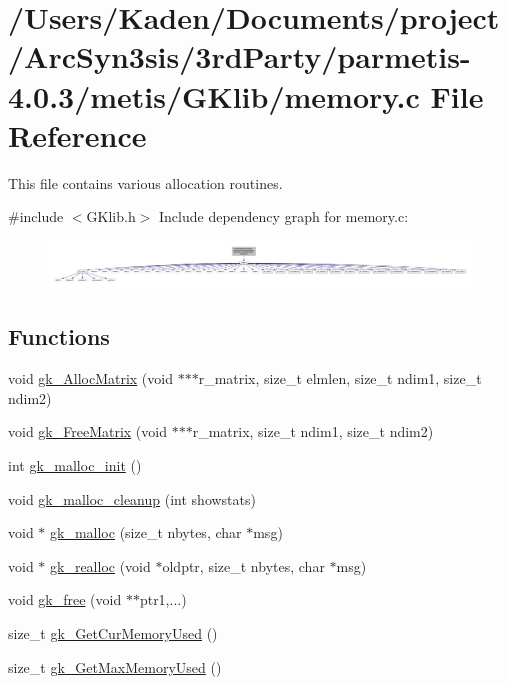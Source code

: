 \hypertarget{a00110}{}\section{/\+Users/\+Kaden/\+Documents/project/\+Arc\+Syn3sis/3rd\+Party/parmetis-\/4.0.3/metis/\+G\+Klib/memory.c File Reference}
\label{a00110}


This file contains various allocation routines.  


{\ttfamily \#include $<$G\+Klib.\+h$>$}\newline
Include dependency graph for memory.\+c\+:\nopagebreak
\begin{figure}[H]
\begin{center}
\leavevmode
\includegraphics[width=350pt]{a00111}
\end{center}
\end{figure}
\subsection*{Functions}
\begin{DoxyCompactItemize}
\item 
void \hyperlink{a00110_af59ba46496f920cc424b8088f4cd7818}{gk\+\_\+\+Alloc\+Matrix} (void $\ast$$\ast$$\ast$r\+\_\+matrix, size\+\_\+t elmlen, size\+\_\+t ndim1, size\+\_\+t ndim2)
\item 
void \hyperlink{a00110_ad4ae7d30c5b5a0128a25d996755f6acb}{gk\+\_\+\+Free\+Matrix} (void $\ast$$\ast$$\ast$r\+\_\+matrix, size\+\_\+t ndim1, size\+\_\+t ndim2)
\item 
int \hyperlink{a00110_a24633cc1c72a7e92836912c2adcf570a}{gk\+\_\+malloc\+\_\+init} ()
\item 
void \hyperlink{a00110_a47156a22528b5bc8c7c6e9849af34e62}{gk\+\_\+malloc\+\_\+cleanup} (int showstats)
\item 
void $\ast$ \hyperlink{a00110_aba6f76f5c67b9b7e9c2e45988d3d3e9d}{gk\+\_\+malloc} (size\+\_\+t nbytes, char $\ast$msg)
\item 
void $\ast$ \hyperlink{a00110_ab76a07ccd25288dd9acc99f5f24a7600}{gk\+\_\+realloc} (void $\ast$oldptr, size\+\_\+t nbytes, char $\ast$msg)
\item 
void \hyperlink{a00110_ac8df62c4e3d0910711a9874f9cc58884}{gk\+\_\+free} (void $\ast$$\ast$ptr1,...)
\item 
size\+\_\+t \hyperlink{a00110_ad2327b94227019b6753b6b09400c0522}{gk\+\_\+\+Get\+Cur\+Memory\+Used} ()
\item 
size\+\_\+t \hyperlink{a00110_a656fd5266ae12a96e53125486f8fea52}{gk\+\_\+\+Get\+Max\+Memory\+Used} ()
\end{DoxyCompactItemize}


